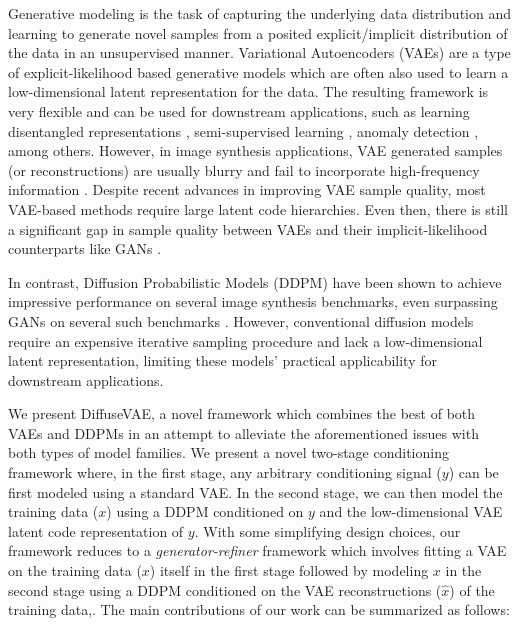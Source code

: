 \documentclass[10pt]{article} \usepackage[accepted]{tmlr}
\begin{document}
Generative modeling is the task of capturing the underlying data distribution and learning to generate novel samples from a posited explicit/implicit distribution of the data in an unsupervised manner. Variational Autoencoders (VAEs) \citep{kingma2014autoencoding, rezende2016variational} are a type of explicit-likelihood based generative models which are often also used to learn a low-dimensional latent representation for the data. The resulting framework is very flexible and can be used for downstream applications, such as learning disentangled representations \citep{Higgins2017betaVAELB, chen2019isolating, burgess2018understanding}, semi-supervised learning \citep{kingma2014semisupervised}, anomaly detection \citep{pol2020anomaly}, among others. However, in image synthesis applications, VAE generated samples (or reconstructions) are usually blurry and fail to incorporate high-frequency information \citep{dosovitskiy2016generating}. Despite recent advances \citep{oord2018neural, razavi2019generating, vahdat2021nvae, child2021deep, xiao2021vaebm} in improving VAE sample quality, most VAE-based methods require large latent code hierarchies. Even then, there is still a significant gap in sample quality between VAEs and their implicit-likelihood counterparts like GANs \citep{goodfellow2014generative, karras2018progressive, karras2019stylebased, karras2020analyzing}.

\par In contrast, Diffusion Probabilistic Models (DDPM) \citep{sohldickstein2015deep, ho2020denoising} have been shown to achieve impressive performance on several image synthesis benchmarks, even surpassing GANs on several such benchmarks \citep{dhariwal2021diffusion, ho2021cascaded}. However, conventional diffusion models require an expensive iterative sampling procedure and lack a low-dimensional latent representation, limiting these models' practical applicability for downstream applications.

\par
We present DiffuseVAE, a novel framework which combines the best of both VAEs and DDPMs in an attempt to alleviate the aforementioned issues with both types of model families. We present a novel two-stage conditioning framework where, in the first stage, any arbitrary conditioning signal ($y$) can be first modeled using a standard VAE. In the second stage, we can then model the training data ($x$) using a DDPM conditioned on $y$ and the low-dimensional VAE latent code representation of $y$. With some simplifying design choices, our framework reduces to a \textit{generator-refiner} framework which involves fitting a VAE on the training data ($x$) itself in the first stage followed by modeling $x$ in the second stage using a DDPM conditioned on the VAE reconstructions ($\hat{x}$) of the training data,. The main contributions of our work can be summarized as follows:
\end{document}
